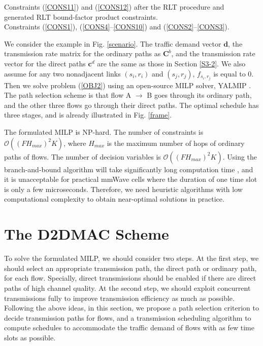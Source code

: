 \documentclass[journal]{IEEEtran}
\begin{document}
\hspace{0.15cm}Constraints (\ref{CONS11}) and (\ref{CONS12}) after the RLT procedure and \\

\hspace{0.15cm}generated RLT bound-factor product constraints.\\

\hspace{0.15cm}Constraints (\ref{CONS1}), (\ref{CONS4}--\ref{CONS10}) and
(\ref{CONS2}--\ref{CONS3}).



\vbox{}



We consider the example in Fig. \ref{scenario}. The traffic demand vector $\textbf{d}$, the
transmission rate matrix for the ordinary paths as $\textbf{C}^b$, and the transmission rate vector
for the direct paths $\textbf{c}^d$ are the same as those in Section \ref{S3-2}. We also assume for
any two nonadjacent links $(s_i,r_i)$ and $(s_j,r_j)$, $f_{{s_i},{r_j}}$ is equal to 0. Then we
solve problem (\ref{OBJ2}) using an open-source MILP solver, YALMIP \cite{yalmip}. The path
selection scheme is that flow A $\to$ B goes through its ordinary path, and the other three flows
go through their direct paths. The optimal schedule has three stages, and is already illustrated in
Fig. \ref{frame}.

The formulated MILP is NP-hard. The number of constraints is $\mathcal{O}(({FH_{max}})^2K)$, where
$H_{max}$ is the maximum number of hops of ordinary paths of flows. The number of decision
variables is $\mathcal{O}((FH_{max})^2K)$. Using the branch-and-bound algorithm will take
significantly long computation time \cite{mao}, and it is unacceptable for practical mmWave cells
where the duration of one time slot is only a few microseconds. Therefore, we need heuristic
algorithms with low computational complexity to obtain near-optimal solutions in practice.









\section{The D2DMAC Scheme}\label{S5}

To solve the formulated MILP, we should consider two steps. At the first step, we should select an
appropriate transmission path, the direct path or ordinary path, for each flow. Specially, direct transmissions should be enabled if there are direct paths of high channel quality. At the second
step, we should exploit concurrent transmissions fully to improve transmission
efficiency as much as possible. Following the above ideas, in this section, we propose a path
selection criterion to decide transmission paths for flows, and a transmission scheduling algorithm
to compute schedules to accommodate the traffic demand of flows with as few time slots as possible.
\end{document}
